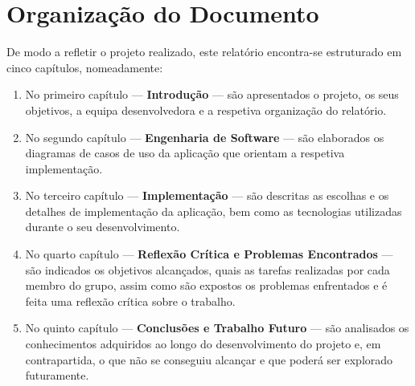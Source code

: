 \section{Organização do Documento}
\label{sec::intro:organizacao}

De modo a refletir o projeto realizado, este relatório encontra-se estruturado em cinco capítulos, nomeadamente:

\begin{enumerate}
\item No primeiro capítulo --- \textbf{Introdução} --- são apresentados o projeto, os seus objetivos, a equipa desenvolvedora e a respetiva organização do relatório.

\item No segundo capítulo --- \textbf{Engenharia de Software} --- são elaborados os diagramas de casos de uso da aplicação que orientam a respetiva implementação.

\item No terceiro capítulo --- \textbf{Implementação} --- são descritas as escolhas e os detalhes de implementação da aplicação, bem como as tecnologias utilizadas durante o seu desenvolvimento.

\item No quarto capítulo --- \textbf{Reflexão Crítica e Problemas Encontrados} --- são indicados os objetivos alcançados, quais as tarefas realizadas por cada membro do grupo, assim como são expostos os problemas enfrentados e é feita uma reflexão crítica sobre o trabalho.

\item No quinto capítulo --- \textbf{Conclusões e Trabalho Futuro} --- são analisados os conhecimentos adquiridos ao longo do desenvolvimento do projeto e, em contrapartida, o que não se conseguiu alcançar e que poderá ser explorado futuramente.
\end{enumerate}
